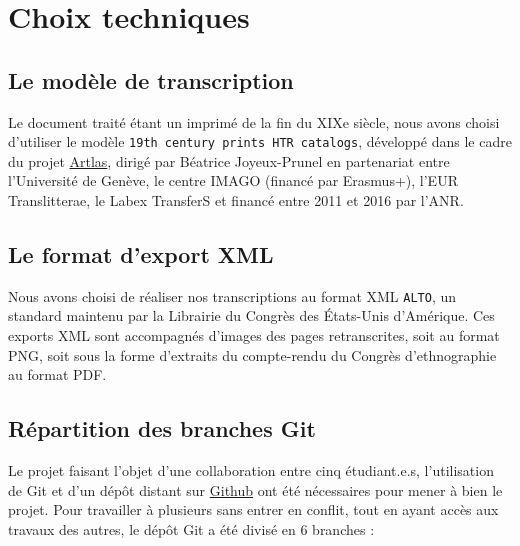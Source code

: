 \documentclass{article}
\begin{document}
	\section{Choix techniques}
	
	\subsection{Le modèle de transcription}
	
	Le document traité étant un imprimé de la fin du XIXe siècle, nous avons choisi d'utiliser le modèle \texttt{19th century prints HTR catalogs}, développé dans le cadre du projet \href{https://artlas.huma-num.fr/fr/}{Artlas}, dirigé par Béatrice Joyeux-Prunel en partenariat entre l'Université de Genève, le centre IMAGO (financé par Erasmus+), l'EUR Translitterae, le Labex TransferS et financé entre 2011 et 2016 par l'ANR.
	
	
	\subsection{Le format d'export XML}
	
	Nous avons choisi de réaliser nos transcriptions au format XML \texttt{ALTO}, un standard maintenu par la Librairie du Congrès des États-Unis d'Amérique. Ces exports XML sont accompagnés d'images des pages retranscrites, soit au format PNG, soit sous la forme d'extraits du compte-rendu du Congrès d'ethnographie au format PDF.
 	
	\subsection{Répartition des branches Git}
	
	Le projet faisant l'objet d'une collaboration entre cinq étudiant.e.s, l'utilisation de Git et d'un dépôt distant sur \href{https://github.com/kat-kel/TNAH-2021-Expositions_Universelles/}{Github} ont été nécessaires pour mener à bien le projet. Pour travailler à plusieurs sans entrer en conflit, tout en ayant accès aux travaux des autres, le dépôt Git a été divisé en 6 branches :
	
\end{document}
